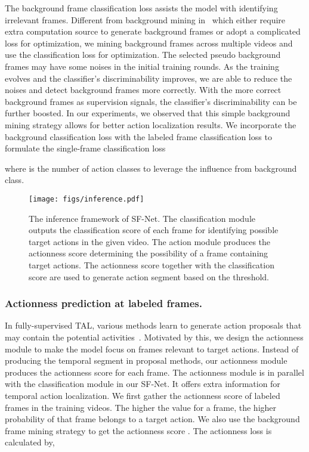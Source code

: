 \documentclass[runningheads]{llncs}
\begin{document}
	The background frame classification loss assists the model with identifying irrelevant frames. Different from background mining in~\cite{Liu_2019_CVPR,Nguyen_2019_ICCV} which either require extra computation source to generate background frames or adopt a complicated loss for optimization, we mining background frames across multiple videos and use the classification loss for optimization. 
	The selected pseudo background frames may have some noises in the initial training rounds. As the training evolves and the classifier’s discriminability improves, we are able to reduce the noises and detect background frames more correctly. With the more correct background frames as supervision signals, the classifier’s discriminability can be further boosted.
In our experiments, we observed that this simple background mining strategy allows for better action localization results.
	We incorporate the background classification loss with the labeled frame classification loss to formulate the single-frame classification loss
	
	where  is the number of action classes to leverage the influence from background class. 
	
	\begin{figure}[!t]
		\centering
		\texttt{[image: figs/inference.pdf]}
		\caption{The inference framework of SF-Net. The classification module outputs the classification score  of each frame for identifying possible target actions in the given video.
			The action module produces the actionness score determining the possibility of a frame containing target actions. The actionness score together with the classification score are used to generate action segment based on the threshold. }
		\label{fig:fig2}
	\end{figure}
	
	
	\subsubsection{Actionness prediction at labeled frames.}
	In fully-supervised TAL, various methods learn to generate action proposals that may contain the potential activities~\cite{xu2017r,lin2018bsn,chao2018rethinking}. 
	Motivated by this, we design the actionness module to make the model focus on frames relevant to target actions.
	Instead of producing the temporal segment in proposal methods, our actionness module produces the actionness score for each frame.
	The actionness module is in parallel with the classification module in our SF-Net. It offers extra information for temporal action localization.
	We first gather the actionness score  of labeled frames in the training videos.
	The higher the value for a frame, the higher probability of that frame belongs to a target action. 
	We also use the background frame mining strategy to get the actionness score .
	The actionness loss is calculated by, 	
	
\end{document}
